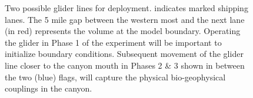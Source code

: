 \begin{figure}[!b]
  \centering 
  \hspace{+0.3cm} 
  \caption{Two possible \soc glider lines for
    deployment.  indicates marked shipping
    lanes. The 5 mile gap between the western most and the next lane
    (in red) represents the volume at the model boundary. Operating
    the glider in Phase 1 of the experiment will be important to
    initialize boundary conditions. Subsequent movement of the glider
    line closer to the \naz canyon mouth in Phases 2 \& 3 shown in
     between the two (blue) flags, will capture
    the physical bio-geophysical couplings in the \naz canyon.}
  \label{fig:glider-ops}
\end{figure}


